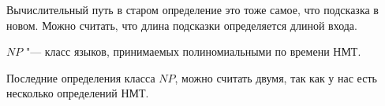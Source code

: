 \begin{Rem}
	Вычислительный путь в старом определение это тоже самое, что подсказка в новом. Можно считать, что длина подсказки определяется длиной входа. 
\end{Rem}

\begin{Def}
	$NP$ "--- класс языков, принимаемых полиномиальными по времени НМТ.
\end{Def}

\begin{Rem}
	Последние определения класса $NP$, можно считать двумя, так как у нас есть несколько определений НМТ.
\end{Rem}